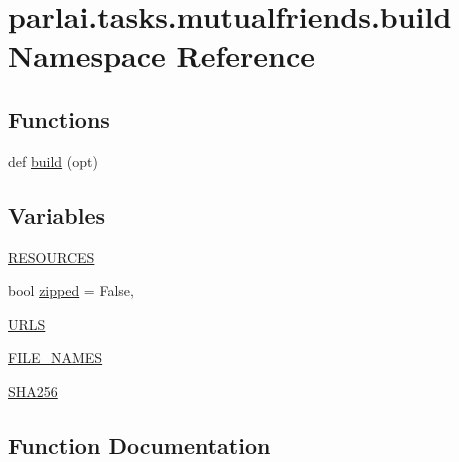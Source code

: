 \hypertarget{namespaceparlai_1_1tasks_1_1mutualfriends_1_1build}{}\section{parlai.\+tasks.\+mutualfriends.\+build Namespace Reference}
\label{namespaceparlai_1_1tasks_1_1mutualfriends_1_1build}
\subsection*{Functions}
\begin{DoxyCompactItemize}
\item 
def \hyperlink{namespaceparlai_1_1tasks_1_1mutualfriends_1_1build_ab42304948cd357bcb503986b9e4bae7a}{build} (opt)
\end{DoxyCompactItemize}
\subsection*{Variables}
\begin{DoxyCompactItemize}
\item 
\hyperlink{namespaceparlai_1_1tasks_1_1mutualfriends_1_1build_a3f910f7699f7aa46c45ca749f51c0177}{R\+E\+S\+O\+U\+R\+C\+ES}
\item 
bool \hyperlink{namespaceparlai_1_1tasks_1_1mutualfriends_1_1build_a7608ecb31d5f4d7f0c95cabe80f2234e}{zipped} = False,
\item 
\hyperlink{namespaceparlai_1_1tasks_1_1mutualfriends_1_1build_a4fa5507e4ea8c9dcb38d7fbef38d3dfc}{U\+R\+LS}
\item 
\hyperlink{namespaceparlai_1_1tasks_1_1mutualfriends_1_1build_a72b8fc7fca28e8cc2479b811900b9901}{F\+I\+L\+E\+\_\+\+N\+A\+M\+ES}
\item 
\hyperlink{namespaceparlai_1_1tasks_1_1mutualfriends_1_1build_a36845d0798c66a3dd5965034d0702aab}{S\+H\+A256}
\end{DoxyCompactItemize}


\subsection{Function Documentation}
\mbox{\label{namespaceparlai_1_1tasks_1_1mutualfriends_1_1build_ab42304948cd357bcb503986b9e4bae7a}} 
